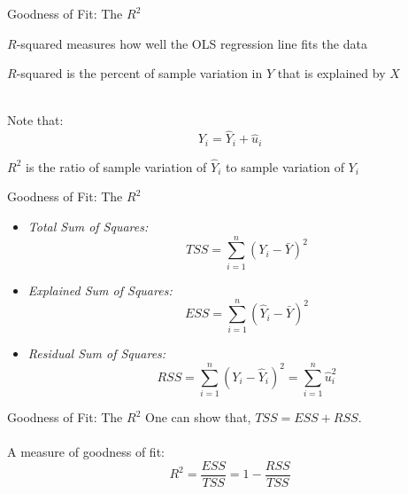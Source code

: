 \documentclass{./../div_teaching_slides}
\begin{document}
\begin{frame}{Goodness of Fit: The $R^2$}
\begin{witemize}
  \item $R$-squared measures how well the OLS regression line fits the data
  \item $R$-squared is the percent of sample variation in $Y$ that is explained by $X$ \\~\\
\end{witemize}
Note that:
$$ Y_i = \hat{Y}_i +  \hat{u}_i $$

\vspace{0.5em}
$R^2$ is the ratio of sample variation of $\hat{Y}_i$ to sample variation of $Y_i$
\end{frame}

\begin{frame}{Goodness of Fit: The $R^2$}
\begin{itemize}
\item[]   \textit{Total Sum of Squares:} $$ \quad TSS = \sum_{i=1}^n (Y_i-\bar{Y})^2 $$
\item[]  \textit{Explained Sum of Squares:} $$ \quad ESS = \sum_{i=1}^n (\hat{Y}_i-\bar{Y})^2 $$
\item[]   \textit{Residual Sum of Squares:} $$ \quad RSS = \sum_{i=1}^n (Y_i-\hat{Y}_i)^2 =\sum_{i=1}^n \hat{u}_i^2$$
\end{itemize}
\end{frame}


\begin{frame}{Goodness of Fit: The $R^2$}
One can show that, $TSS = ESS + RSS$. \\~\\
A measure of goodness of fit: 
$$ R^2 = \frac{ESS}{TSS} = 1-\frac{RSS}{TSS} $$
\end{frame}
\end{document}
